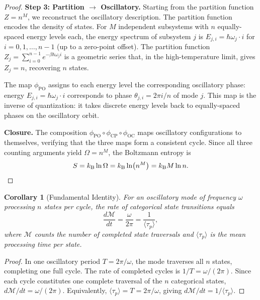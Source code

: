 \documentclass[11pt,twocolumn,a4paper]{article}
\newtheorem{corollary}[theorem]{Corollary}
\theoremstyle{definition}
\theoremstyle{remark}
\newcommand{\kB}{k_{\mathrm{B}}}
\newcommand{\Depth}{\mathcal{M}}
\newcommand{\taup}{\tau_p}
\begin{document}
\begin{proof}
\medskip
\noindent\textbf{Step 3: Partition $\to$ Oscillatory.} Starting from the partition function $Z = n^M$, we reconstruct the oscillatory description. The partition function encodes the density of states. For $M$ independent subsystems with $n$ equally-spaced energy levels each, the energy spectrum of subsystem $j$ is $E_{j,i} = \hbar \omega_j \cdot i$ for $i = 0, 1, \ldots, n-1$ (up to a zero-point offset). The partition function $Z_j = \sum_{i=0}^{n-1} e^{-\beta \hbar \omega_j i}$ is a geometric series that, in the high-temperature limit, gives $Z_j = n$, recovering $n$ states.

The map $\phi_{\mathrm{PO}}$ assigns to each energy level the corresponding oscillatory phase: energy $E_{j,i} = \hbar \omega_j \cdot i$ corresponds to phase $\theta_{j,i} = 2\pi i / n$ of mode $j$. This map is the inverse of quantization: it takes discrete energy levels back to equally-spaced phases on the oscillatory orbit.

\medskip
\noindent\textbf{Closure.} The composition $\phi_{\mathrm{PO}} \circ \phi_{\mathrm{CP}} \circ \phi_{\mathrm{OC}}$ maps oscillatory configurations to themselves, verifying that the three maps form a consistent cycle. Since all three counting arguments yield $\Omega = n^M$, the Boltzmann entropy is
\[
  S = \kB \ln \Omega = \kB \ln(n^M) = \kB M \ln n. \qedhere
\]
\end{proof}

\begin{corollary}[Fundamental Identity]\label{cor:fundamental}
For an oscillatory mode of frequency $\omega$ processing $n$ states per cycle, the rate of categorical state transitions equals
\begin{equation}\label{eq:fundamental-id}
  \frac{d\Depth}{dt} = \frac{\omega}{2\pi} = \frac{1}{\langle \taup \rangle},
\end{equation}
where $\Depth$ counts the number of completed state traversals and $\langle \taup \rangle$ is the mean processing time per state.
\end{corollary}

\begin{proof}
In one oscillatory period $T = 2\pi/\omega$, the mode traverses all $n$ states, completing one full cycle. The rate of completed cycles is $1/T = \omega/(2\pi)$. Since each cycle constitutes one complete traversal of the $n$ categorical states, $d\Depth/dt = \omega/(2\pi)$. Equivalently, $\langle \taup \rangle = T = 2\pi/\omega$, giving $d\Depth/dt = 1/\langle \taup \rangle$.
\end{proof}
\end{document}
